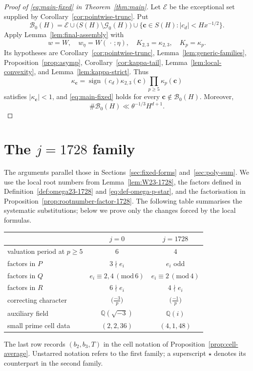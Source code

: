 \documentclass[12pt,reqno]{amsart}
\numberwithin{equation}{section}
\theoremstyle{definition}
\renewcommand{\ge}{\geqslant}
\newcommand{\QQ}{\mathbb{Q}}
\newcommand{\cc}{\mathbf{c}}
\DeclareMathOperator{\sign}{sign}
\newcommand{\rw}{W}
\renewcommand{\pmod}[1]{\,(\mathrm{mod}\,#1)}
\begin{document}
\begin{proof}[Proof of \eqref{eq:main-fixed} in Theorem~\ref{thm:main}]
Let $\mathcal E$ be the exceptional set supplied by Corollary~\ref{cor:pointwise-trunc}.
Put
\begin{equation}\label{eq:def-B0}
\mathcal B_0(H)=\mathcal E\cup\bigl(S(H)\setminus\mathcal G_0(H)\bigr)
\cup\{\cc\in S(H):|c_d|<Hx^{-1/2}\}.
\end{equation}
Apply Lemma~\ref{lem:final-assembly} with
\[
w=\rw,\quad w_\eta=\rw(\,\cdot\,;\eta),\quad
K_{2,3}=\kappa_{2,3},\quad K_p=\kappa_p.
\]
Its hypotheses are Corollary~\ref{cor:pointwise-trunc}, Lemma~\ref{lem:generic-families}, Proposition~\ref{prop:asymp}, Corollary~\ref{cor:kappa-tail}, Lemma~\ref{lem:local-convexity}, and Lemma~\ref{lem:kappa-strict}.
Thus
\begin{equation}\label{eq:kappa-c-product}
\kappa_\cc=\sign(c_d)\kappa_{2,3}(\cc)\prod_{p\ge5}\kappa_p(\cc)
\end{equation}
satisfies $|\kappa_\cc|<1$, and \eqref{eq:main-fixed} holds for every $\cc\notin\mathcal B_0(H)$.
Moreover,
\[
\#\mathcal B_0(H)\ll\theta^{-1/3}H^{d+1}.
\]
\end{proof}

\section{The \texorpdfstring{$j=1728$}{j=1728} family}\label{sec:j1728-generic}

The arguments parallel those in Sections~\ref{sec:fixed-forms} and~\ref{sec:poly-sum}.
We use the local root numbers from Lemma~\ref{lem:W23-1728}, the factors defined in Definition~\ref{def:omega23-1728} and \eqref{eq:def-omega-p-star}, and the factorisation in Proposition~\ref{prop:rootnumber-factor-1728}.
The following table summarises the systematic substitutions; below we prove only the changes forced by the local formulas.
\begin{center}
\begin{tabular}{|l|c|c|}
\hline
 & \emph{$j=0$} & \emph{$j=1728$} \\
\hline
valuation period at $p\ge5$ & $6$ & $4$ \\
\hline
factors in $P$ & $3\nmid e_i$ & $e_i$ odd \\
\hline
factors in $Q$ & $e_i\equiv2,4\pmod6$ & $e_i\equiv2\pmod4$ \\
\hline
factors in $R$ & $6\nmid e_i$ & $4\nmid e_i$ \\
\hline
correcting character & $\bigl(\frac{-3}{p}\bigr)$ & $\bigl(\frac{-1}{p}\bigr)$ \\
\hline
auxiliary field & $\QQ(\sqrt{-3})$ & $\QQ(i)$ \\
\hline
small prime cell data & $(2,2,36)$ & $(4,1,48)$\\
\hline
\end{tabular}
\end{center}
The last row records $(b_2,b_3,T)$ in the cell notation of Proposition~\ref{prop:cell-average}.
Unstarred notation refers to the first family; a superscript $\star$ denotes its counterpart in the second family.
\end{document}
